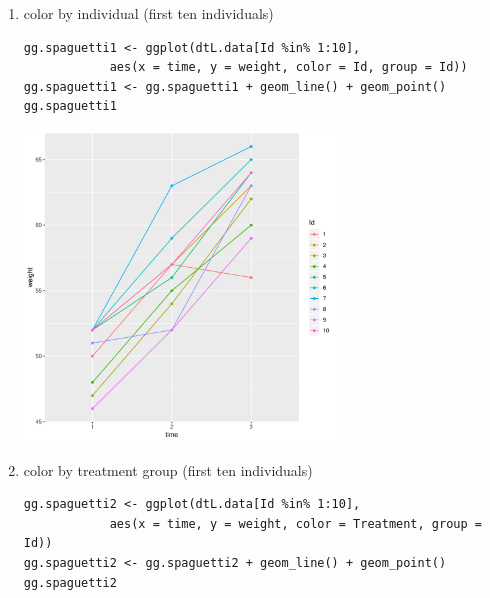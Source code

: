 \documentclass{article}
\begin{document}
\begin{enumerate}
\item color by individual (first ten individuals)
\label{sec:org6686e7e}

\lstset{language=r,label= ,caption= ,captionpos=b,numbers=none}
\begin{lstlisting}
gg.spaguetti1 <- ggplot(dtL.data[Id %in% 1:10], 
			aes(x = time, y = weight, color = Id, group = Id))
gg.spaguetti1 <- gg.spaguetti1 + geom_line() + geom_point()
gg.spaguetti1
\end{lstlisting}

\begin{center}
\includegraphics[width=0.65\textwidth]{./figures/fig-spaguetti1.pdf}
\end{center}


\clearpage

\item color by treatment group (first ten individuals)
\label{sec:org40e2f67}

\lstset{language=r,label= ,caption= ,captionpos=b,numbers=none}
\begin{lstlisting}
gg.spaguetti2 <- ggplot(dtL.data[Id %in% 1:10],
			aes(x = time, y = weight, color = Treatment, group = Id))
gg.spaguetti2 <- gg.spaguetti2 + geom_line() + geom_point()
gg.spaguetti2
\end{lstlisting}


\end{enumerate}
\end{document}
